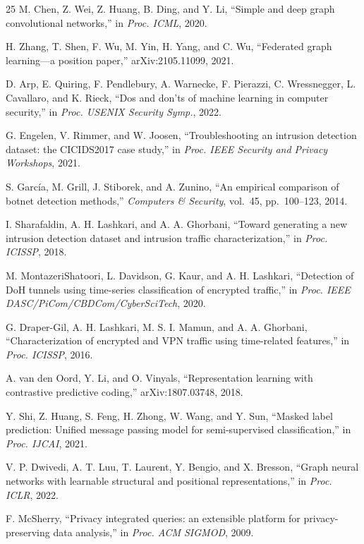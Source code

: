 \documentclass[journal]{IEEEtran}
\begin{document}
\begin{thebibliography}{25}
 M. Chen, Z. Wei, Z. Huang, B. Ding, and Y. Li,
``Simple and deep graph convolutional networks,'' in \emph{Proc.
ICML}, 2020.

 H. Zhang, T. Shen, F. Wu, M. Yin, H. Yang,
and C. Wu, ``Federated graph learning---a position paper,''
arXiv:2105.11099, 2021.

 D. Arp, E. Quiring, F. Pendlebury, A. Warnecke,
F. Pierazzi, C. Wressnegger, L. Cavallaro, and K. Rieck, ``Dos and
don'ts of machine learning in computer security,'' in \emph{Proc.
USENIX Security Symp.}, 2022.

 G. Engelen, V. Rimmer, and W. Joosen,
``Troubleshooting an intrusion detection dataset: the CICIDS2017 case
study,'' in \emph{Proc. IEEE Security and Privacy Workshops}, 2021.

 S. Garc\'ia, M. Grill, J. Stiborek, and A. Zunino,
``An empirical comparison of botnet detection methods,''
\emph{Computers \& Security}, vol.~45, pp.~100--123, 2014.

 I. Sharafaldin, A. H. Lashkari, and A. A. Ghorbani,
``Toward generating a new intrusion detection dataset and intrusion
traffic characterization,'' in \emph{Proc. ICISSP}, 2018.

 M. MontazeriShatoori, L. Davidson, G. Kaur, and
A. H. Lashkari, ``Detection of DoH tunnels using time-series
classification of encrypted traffic,'' in \emph{Proc. IEEE
DASC/PiCom/CBDCom/CyberSciTech}, 2020.

 G. Draper-Gil, A. H. Lashkari, M. S. I. Mamun, and
A. A. Ghorbani, ``Characterization of encrypted and VPN traffic using
time-related features,'' in \emph{Proc. ICISSP}, 2016.

 A. van den Oord, Y. Li, and O. Vinyals,
``Representation learning with contrastive predictive coding,''
arXiv:1807.03748, 2018.

 Y. Shi, Z. Huang, S. Feng, H. Zhong, W. Wang,
and Y. Sun, ``Masked label prediction: Unified message passing model
for semi-supervised classification,'' in \emph{Proc. IJCAI}, 2021.

 V. P. Dwivedi, A. T. Luu, T. Laurent, Y. Bengio, and
X. Bresson, ``Graph neural networks with learnable structural and
positional representations,'' in \emph{Proc. ICLR}, 2022.

 F. McSherry, ``Privacy integrated queries: an
extensible platform for privacy-preserving data analysis,'' in
\emph{Proc. ACM SIGMOD}, 2009.

\end{thebibliography}
\end{document}
